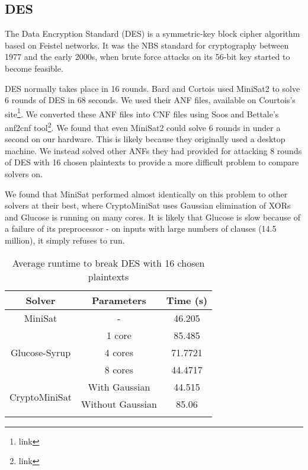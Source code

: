 \subsection{DES}
\label{sec:encoding:des}

The Data Encryption Standard (DES) is a symmetric-key block cipher algorithm based on Feistel networks. It was the NBS standard for cryptography between 1977 and the early 2000s, when brute force attacks on its 56-bit key started to become feasible.\cite{find appropriate citation}


DES normally takes place in 16 rounds. Bard and Cortois\cite{citation} used MiniSat2 to solve 6 rounds of DES in 68 seconds. We used their ANF files, available on Courtois's site\footnote{link}. We converted these ANF files into CNF files using Soos and Bettale's anf2cnf tool\footnote{link}. We found that even MiniSat2 could solve 6 rounds in under a second on our hardware. This is likely because they originally used a desktop machine. We instead solved other ANFs they had provided for attacking 8 rounds of DES with 16 chosen plaintexts to provide a more difficult problem to compare solvers on.

We found that MiniSat performed almost identically on this problem to other solvers at their best, where CryptoMiniSat uses Gaussian elimination of XORs and Glucose is running on many cores. It is likely that Glucose is slow because of a failure of its preprocessor - on inputs with large numbers of clauses (14.5 million), it simply refuses to run. 

\begin{table}[!htbp]
	\centering
	\begin{tabular}{|c|c|c|}
		\hline
		\textbf{Solver} & \textbf{Parameters} & \textbf{Time (s)} \\
		\hline
		MiniSat & - & 46.205 \\
		\hline
		\multirow{3}{*}{Glucose-Syrup} & 1 core & 85.485 \\ \cline{2-3}
		& 4 cores & 71.7721 \\ \cline{2-3}
		& 8 cores & 44.4717 \\
		\hline
		
		\multirow{3}{*}{CryptoMiniSat} & With Gaussian & 44.515 \\ \cline{2-3} 
		& Without Gaussian & 85.06 \\ \cline{2-3} 
		\hline
	\end{tabular}
	
	\caption{Average runtime to break DES with 16 chosen plaintexts}
	\label{table:des:runtime}
\end{table}
